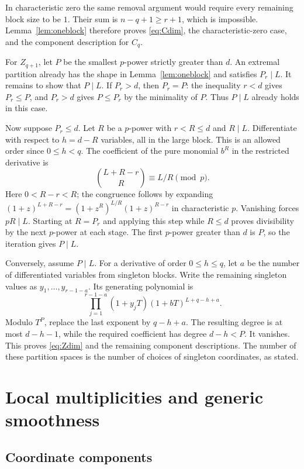 \documentclass[11pt]{article}
\theoremstyle{remark}
\begin{document}
In characteristic zero the same removal argument would require
every remaining block size to be $1$. Their sum is
$n-q+1\ge r+1$, which is impossible. Lemma~\ref{lem:oneblock}
therefore proves \eqref{eq:Cdim}, the characteristic-zero case,
and the component description for $C_q$.

For $Z_{q+1}$, let $P$ be the smallest $p$-power strictly greater
than $d$. An extremal partition already has the shape in
Lemma~\ref{lem:oneblock} and satisfies $P_r\mid L$. It remains to
show that $P\mid L$. If $P_r>d$, then $P_r=P$: the inequality
$r<d$ gives $P_r\le P$, and $P_r>d$ gives $P\le P_r$ by the
minimality of $P$. Thus $P\mid L$ already holds in this case.

Now suppose $P_r\le d$. Let $R$ be a $p$-power with $r<R\le d$
and $R\mid L$. Differentiate with respect to $h=d-R$ variables,
all in the large block. This is an allowed order since $0\le h<q$.
The coefficient of the pure monomial $b^R$ in the restricted
derivative is
\[
 \binom{L+R-r}{R}\equiv L/R\pmod p.
\]
Here $0<R-r<R$; the congruence follows by expanding
$(1+z)^{L+R-r}=(1+z^R)^{L/R}(1+z)^{R-r}$ in characteristic $p$.
Vanishing forces $pR\mid L$. Starting at $R=P_r$ and applying
this step while $R\le d$ proves divisibility by the next $p$-power
at each stage. The first $p$-power greater than $d$ is $P$, so the
iteration gives $P\mid L$.

Conversely, assume $P\mid L$. For a derivative of order
$0\le h\le q$, let $a$ be the number of differentiated variables
from singleton blocks. Write the remaining singleton values as
$y_1,\ldots,y_{r-1-a}$. Its generating polynomial is
\[
 \prod_{j=1}^{r-1-a}(1+y_jT)
 (1+bT)^{L+q-h+a}.
\]
Modulo $T^P$, replace the last exponent by $q-h+a$. The resulting
degree is at most $d-h-1$, while the required coefficient has
degree $d-h<P$. It vanishes. This proves \eqref{eq:Zdim} and
the remaining component descriptions. The number of these partition
spaces is the number of choices of singleton coordinates, as stated.

\section{Local multiplicities and generic smoothness}\label{sec:local}

\subsection{Coordinate components}
\end{document}
